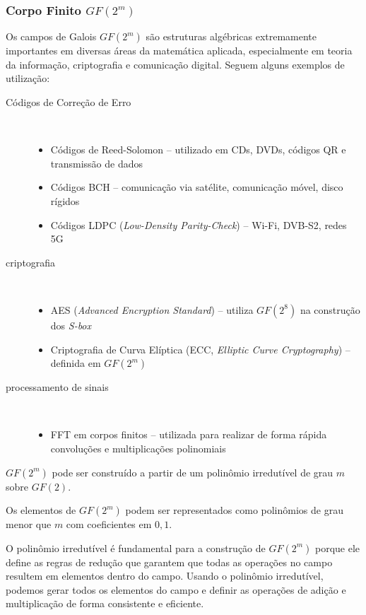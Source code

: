 \documentclass[portuguese,aspectratio=169]{beamer}
\begin{document}
\begin{frame}[allowframebreaks]
  \frametitle{Corpo Finito $GF(2^m)$}
  Os campos de Galois $GF(2^m)$ são estruturas algébricas extremamente importantes em diversas áreas da matemática aplicada, especialmente em teoria da informação, criptografia e comunicação digital.
  Seguem alguns exemplos de utilização:
  \begin{description}
    \item[Códigos de Correção de Erro]\hfill \\
      \begin{itemize}
        \item Códigos de Reed-Solomon -- utilizado em CDs, DVDs, códigos QR e transmissão de dados
        \item Códigos BCH -- comunicação via satélite, comunicação móvel, disco rígidos
        \item Códigos LDPC (\emph{Low-Density Parity-Check}) -- Wi-Fi, DVB-S2, redes 5G
      \end{itemize}
    \framebreak
    \item[criptografia]\hfill \\
      \begin{itemize}
        \item AES (\emph{Advanced Encryption Standard}) -- utiliza $GF(2^8)$ na construção dos \emph{S-box}
        \item Criptografia de Curva Elíptica (ECC, \emph{Elliptic Curve Cryptography}) -- definida em $GF(2^m)$
      \end{itemize}
    \item[processamento de sinais]\hfill \\
      \begin{itemize}
        \item FFT em corpos finitos -- utilizada para realizar de forma rápida convoluções e multiplicações polinomiais
        \end{itemize}
  \end{description}

  \framebreak
  $GF(2^m)$ pode ser construído a partir de um polinômio irredutível de grau $m$ sobre $GF(2)$.

  \vspace{2ex}
  Os elementos de $GF(2^m)$ podem ser representados como polinômios de grau menor que $m$ com coeficientes em ${0,1}$.

  \vspace{2ex}
  O polinômio irredutível é fundamental para a construção de $GF(2^m)$ porque
  ele define as regras de redução que garantem que todas as operações no campo
  resultem em elementos dentro do campo. Usando o polinômio irredutível,
  podemos gerar todos os elementos do campo e definir as operações de adição e
  multiplicação de forma consistente e eficiente.
\end{frame}
\end{document}
